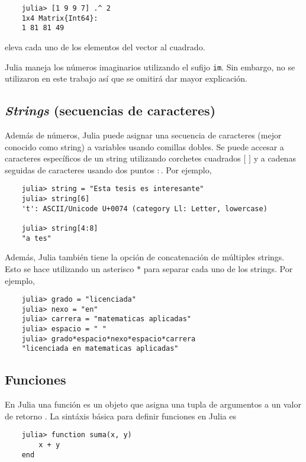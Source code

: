 \begin{verbatim}
	julia> [1 9 9 7] .^ 2
	1x4 Matrix{Int64}:
	1 81 81 49
\end{verbatim}

 \noindent eleva cada uno de los elementos del vector al cuadrado. 

\textsf{Julia} maneja los números imaginarios utilizando el sufijo \texttt{im}. Sin embargo, no se utilizaron en este trabajo así que se omitirá dar mayor explicación. 

\subsection{\textit{Strings} (secuencias de caracteres)} 

Además de números, \textsf{Julia} puede asignar una secuencia de caracteres (mejor conocido como string) a variables usando comillas dobles. Se puede accesar a caracteres específicos de un string utilizando corchetes cuadrados $[$ $]$ y a cadenas seguidas de caracteres usando dos puntos $:$. Por ejemplo,

\begin{verbatim}
    julia> string = "Esta tesis es interesante"
    julia> string[6]
    't': ASCII/Unicode U+0074 (category Ll: Letter, lowercase)
    
    julia> string[4:8]
    "a tes"
\end{verbatim}

Además, \textsf{Julia} también tiene la opción de concatenación de múltiples strings. Esto se hace utilizando un asterisco $*$ para separar cada uno de los strings. Por ejemplo,

\begin{verbatim}
	julia> grado = "licenciada"
	julia> nexo = "en"
	julia> carrera = "matematicas aplicadas"
	julia> espacio = " "
	julia> grado*espacio*nexo*espacio*carrera
	"licenciada en matematicas aplicadas"
\end{verbatim}

\subsection{Funciones}
En \textsf{Julia} una función es un objeto que asigna una tupla de argumentos a un valor de retorno \cite{manual_Julia}. La sintáxis básica para definir funciones en \textsf{Julia} es 

\begin{verbatim}
	julia> function suma(x, y)
		x + y
	end
\end{verbatim}

